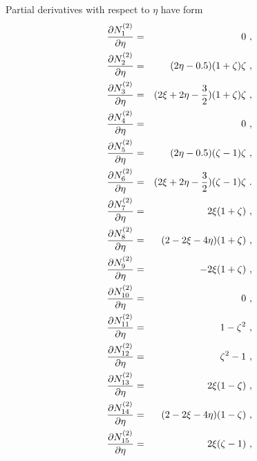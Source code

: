 Partial derivatives with respect to $\eta$ have form
\begin{eqnarray}
\label{bfquadweddy1}
\ppd{N_1^{(2)}}{\eta} &=& 0\ ,
\\
\label{bfquadweddy2}
\ppd{N_2^{(2)}}{\eta} &=& (2\eta-0.5)(1 + \zeta)\zeta\ ,
\\
\label{bfquadweddy3}
\ppd{N_3^{(2)}}{\eta} &=& (2\xi + 2\eta -\del{3}{2})(1 + \zeta)\zeta\ ,
\\
\label{bfquadweddy4}
\ppd{N_4^{(2)}}{\eta} &=& 0\ ,
\\
\label{bfquadweddy5}
\ppd{N_5^{(2)}}{\eta} &=& (2\eta-0.5)(\zeta - 1)\zeta\ ,
\\
\label{bfquadweddy6}
\ppd{N_6^{(2)}}{\eta} &=& (2\xi + 2\eta - \del{3}{2})(\zeta - 1)\zeta\ .
\\
\label{bfquadweddy7}
\ppd{N_7^{(2)}}{\eta} &=& 2 \xi (1 + \zeta)\ ,
\\
\label{bfquadweddy8}
\ppd{N_8^{(2)}}{\eta} &=& (2 - 2\xi - 4\eta)(1 + \zeta)\ ,
\\
\label{bfquadweddy9}
\ppd{N_9^{(2)}}{\eta} &=& -2 \xi (1 + \zeta)\ ,
\\
\label{bfquadweddy10}
\ppd{N_{10}^{(2)}}{\eta} &=& 0\ ,
\\
\label{bfquadweddy11}
\ppd{N_{11}^{(2)}}{\eta} &=& 1 - \zeta^2\ ,
\\
\label{bfquadweddy12}
\ppd{N_{12}^{(2)}}{\eta} &=& \zeta^2 - 1\ ,
\\
\label{bfquadweddy13}
\ppd{N_{13}^{(2)}}{\eta} &=& 2 \xi (1 - \zeta)\ ,
\\
\label{bfquadweddy14}
\ppd{N_{14}^{(2)}}{\eta} &=& (2 - 2\xi - 4\eta)(1 - \zeta)\ ,
\\
\label{bfquadweddy15}
\ppd{N_{15}^{(2)}}{\eta} &=& 2 \xi (\zeta - 1)\ ,
\end{eqnarray}


